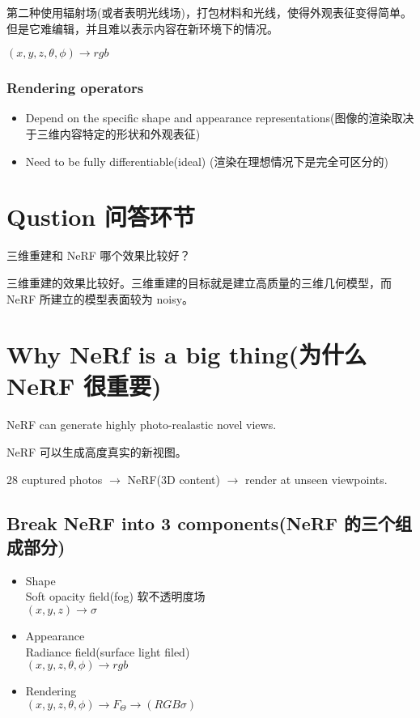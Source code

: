 \documentclass[cn,hazy,blue,14pt,screen]{elegantnote}
\begin{document}
第二种使用辐射场(或者表明光线场)，打包材料和光线，使得外观表征变得简单。但是它难编辑，并且难以表示内容在新环境下的情况。

$(x,y,z,\theta,\phi)\rightarrow rgb$

\subsubsection{Rendering operators}

\begin{itemize}
\item Depend on the specific shape and appearance representations(图像的渲染取决于三维内容特定的形状和外观表征)
\item Need to be fully differentiable(ideal) (渲染在理想情况下是完全可区分的)
\end{itemize}

\section*{Qustion 问答环节}

三维重建和 NeRF 哪个效果比较好？

三维重建的效果比较好。三维重建的目标就是建立高质量的三维几何模型，而 NeRF 所建立的模型表面较为 noisy。

\section{Why NeRf is a big thing(为什么 NeRF 很重要)}

NeRF can generate highly photo-realastic novel views.

NeRF 可以生成高度真实的新视图。

\begin{example}
28 cuptured photos $\rightarrow$ NeRF(3D content) $\rightarrow$ render at unseen viewpoints.
\end{example}

\subsection{Break NeRF into 3 components(NeRF 的三个组成部分)}

\begin{itemize}
\item Shape\\
Soft opacity field(fog) 软不透明度场\\
$(x,y,z)\rightarrow\sigma$
\item Appearance\\
Radiance field(surface light filed)\\
$(x,y,z,\theta,\phi)\rightarrow rgb$
\item Rendering\\
$(x,y,z,\theta,\phi)\rightarrow F_\Theta\rightarrow(RGB\sigma)$
\end{itemize}
\end{document}
